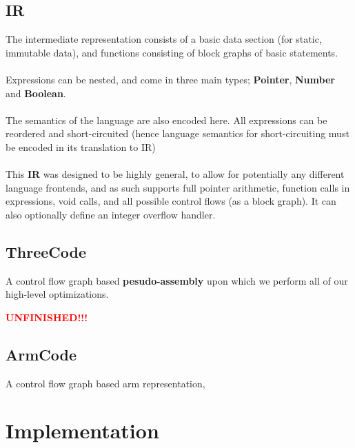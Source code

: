 \documentclass{article}
\newcommand{\keyword}[1]{\textbf{#1}}
\newcommand{\unfinished}{\begin{huge} \textcolor{red}{\textbf{UNFINISHED!!!}} \end{huge}}
\begin{document}
        \subsection*{IR}
            The intermediate representation consists of a basic data section (for static, immutable data),
            and functions consisting of block graphs of basic statements.
            \\
            \\ Expressions can be nested, and come in three main types; \keyword{Pointer}, \keyword{Number} 
            and \keyword{Boolean}.
            \\
            \\ The semantics of the language are also encoded here. All expressions can be reordered and 
            short-circuited (hence language semantics for short-circuiting must be encoded in its translation to IR)
            \\
            \\ This \keyword{IR} was designed to be highly general, to allow for potentially any different 
            language frontends, and as such supports full pointer arithmetic, function calls in expressions, 
            void calls, and all possible control flows (as a block graph). It can also optionally define an 
            integer overflow handler.
        
        \subsection*{ThreeCode}
            A control flow graph based \keyword{pesudo-assembly} upon which we perform all of our high-level 
            optimizations.
            \unfinished
        
        \subsection*{ArmCode}
            A control flow graph based arm representation,

    \section*{Implementation}
\end{document}
